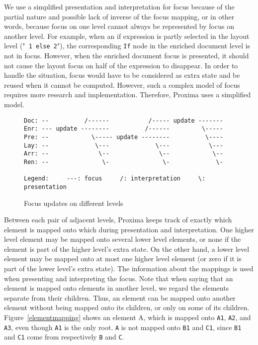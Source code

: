 We use a simplified presentation and interpretation for focus because of  the partial nature and possible lack of inverse of the focus mapping, or in other words, because focus on one level cannot always be represented by focus on another level. For example, when an if expression is partly selected in the layout level ("{\tt {}\verb| 1 else 2|}"), the corresponding \verb|If| node in the enriched document level is not in focus. However, when the enriched document focus is presented, it should not cause the layout focus on half of the expression to disappear. In order to handle the situation, focus would have to be considered as extra state and be reused when it cannot be computed. However, such a complex model of focus requires more research and implementation. Therefore, Proxima uses a simplified model.  

\begin{figure}
\begin{small}
\begin{center}
\begin{verbatim}
Doc: --          /------           /----- update -------
Enr: --- update --------          /------         \-----
Pre: --            \----- update --------          \----
Lay: --             \---             \---           \---
Arr: --              \--              \--            \--
Ren: --               \-               \-             \-

Legend:     ---: focus     /: interpretation     \: presentation
\end{verbatim}
\caption{Focus updates on different levels}\label{focusUpdates} 
\end{center}
\end{small}
\end{figure}


Between each pair of adjacent levels, Proxima keeps track of exactly which element is mapped onto which during presentation and interpretation.  One higher level element may be mapped onto several lower level elements, or none if the element is part of the higher level's extra state. On the other hand, a lower level element may be mapped onto at most one higher level element (or zero if it is part of the lower level's extra state). The information about the mappings is used when presenting and interpreting the focus. Note that when saying that an element is mapped onto elements in another level, we regard the elements separate from their children. Thus, an element can be mapped onto another element without being mapped onto its children, or only on some of its children. Figure~\ref{elementmapping} shows an element A, which is mapped onto \verb|A1|, \verb|A2|, and \verb|A3|, even though \verb|A1| is the only root. \verb|A| is not mapped onto \verb|B1| and \verb|C1|, since \verb|B1| and \verb|C1| come from respectively \verb|B| and \verb|C|.  

